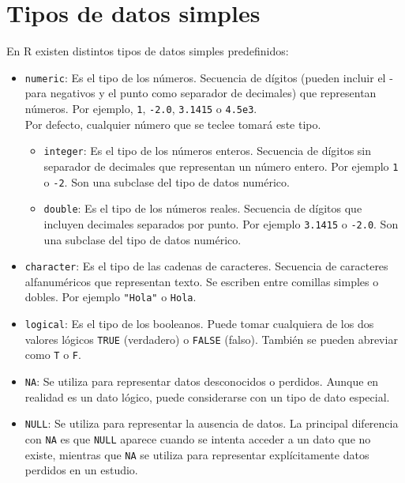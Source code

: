 \documentclass[
  a4paper,
]{scrreport}
\theoremstyle{definition}
\theoremstyle{definition}
\theoremstyle{remark}
\begin{document}

\chapter{Tipos de datos simples}\label{tipos-de-datos-simples}

En R existen distintos tipos de datos simples predefinidos:

\begin{itemize}
\item
  \texttt{numeric}: Es el tipo de los números. Secuencia de dígitos
  (pueden incluir el - para negativos y el punto como separador de
  decimales) que representan números. Por ejemplo, \texttt{1},
  \texttt{-2.0}, \texttt{3.1415} o \texttt{4.5e3}.\\
  Por defecto, cualquier número que se teclee tomará este tipo.

  \begin{itemize}
  \item
    \texttt{integer}: Es el tipo de los números enteros. Secuencia de
    dígitos sin separador de decimales que representan un número entero.
    Por ejemplo \texttt{1} o \texttt{-2}. Son una subclase del tipo de
    datos numérico.
  \item
    \texttt{double}: Es el tipo de los números reales. Secuencia de
    dígitos que incluyen decimales separados por punto. Por ejemplo
    \texttt{3.1415} o \texttt{-2.0}. Son una subclase del tipo de datos
    numérico.
  \end{itemize}
\item
  \texttt{character}: Es el tipo de las cadenas de caracteres. Secuencia
  de caracteres alfanuméricos que representan texto. Se escriben entre
  comillas simples o dobles. Por ejemplo \texttt{"Hola"} o
  \texttt{\textquotesingle{}Hola\textquotesingle{}}.
\item
  \texttt{logical}: Es el tipo de los booleanos. Puede tomar cualquiera
  de los dos valores lógicos \texttt{TRUE} (verdadero) o \texttt{FALSE}
  (falso). También se pueden abreviar como \texttt{T} o \texttt{F}.
\item
  \texttt{NA}: Se utiliza para representar datos desconocidos o
  perdidos. Aunque en realidad es un dato lógico, puede considerarse con
  un tipo de dato especial.
\item
  \texttt{NULL}: Se utiliza para representar la ausencia de datos. La
  principal diferencia con \texttt{NA} es que \texttt{NULL} aparece
  cuando se intenta acceder a un dato que no existe, mientras que
  \texttt{NA} se utiliza para representar explícitamente datos perdidos
  en un estudio.
\end{itemize}
\end{document}
